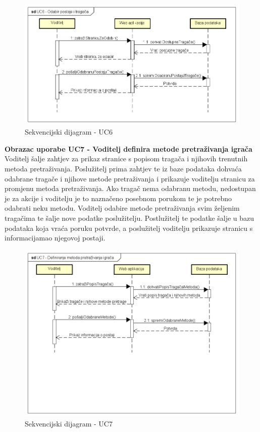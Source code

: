 				\begin{figure}[H]
					\includegraphics[scale=0.7]{slike/UC6_sekv.PNG} %
					\centering
					\caption{Sekvencijski dijagram - UC6}
					\label{fig:promjene}
				\end{figure}
				\eject
				
				\noindent \textbf{Obrazac uporabe UC7 - Voditelj definira metode pretraživanja igrača}\\
				
				\noindent Voditelj šalje zahtjev za prikaz stranice s popisom tragača i njihovih trenutnih metoda pretraživanja. Poslužitelj prima zahtjev te iz baze podataka dohvaća odabrane tragače i njihove metode pretraživanja i prikazuje voditelju stranicu za promjenu metoda pretraživanja. Ako tragač nema odabranu metodu, nedostupan je za akcije i voditelju je to naznačeno posebnom porukom te je potrebno odabrati neku metodu. Voditelj odabire metode pretraživanja svim željenim tragačima te šalje nove podatke poslužitelju. Postlužitelj te podatke šalje u bazu podataka koja vraća poruku potvrde, a poslužitelj voditelju prikazuje stranicu s informacijamao njegovoj postaji.
				
				\begin{figure}[H]
					\includegraphics[scale=0.7]{slike/UC7_sekv.PNG} %
					\centering
					\caption{Sekvencijski dijagram - UC7}
					\label{fig:promjene}
				\end{figure}
				\eject
				

